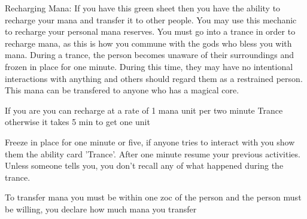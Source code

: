 \documentclass[green]{guildcamp3}
\begin{document}
	
	\name{\gManaRecharge{}}
	
	
	
	
	Recharging Mana:
	If you have this green sheet then you have the ability to recharge your mana and transfer it to other people.
	You may use this mechanic to recharge your personal mana reserves. You must go into a trance in order to recharge mana, as this is how you commune with the gods who bless you with mana. 	During a trance, the person becomes unaware of their surroundings and frozen in place for one minute. During this time, they may have no intentional interactions with anything and others should regard them as a restrained person. This mana can be transfered to anyone who has a magical core. 
	
	
	
	
	\begin{enum}[Directions]
		\item If you are \cPaladin{} you can recharge at a rate of 1 mana unit per two minute Trance otherwise it takes 5 min to get one unit 
		\item Freeze in place for one minute or five, if anyone tries to interact with you show them the ability card 'Trance'. After one minute resume your previous activities. Unless someone tells you, you don't recall any of what happened during the trance.
		\item To transfer mana you must be within one zoc of the person and the person must be willing, you declare how much mana you transfer
	\end{enum}
	
\end{document}
